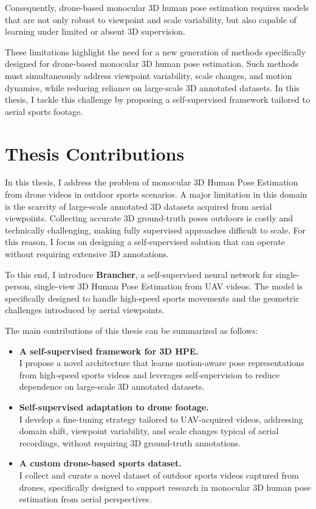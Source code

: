 Consequently, drone-based monocular 3D human pose estimation requires models that are not only robust to viewpoint and scale variability, but also capable of learning under limited or absent 3D supervision.

These limitations highlight the need for a new generation of methods specifically designed for drone-based monocular 3D human pose estimation. Such methods must simultaneously address viewpoint variability, scale changes, and motion dynamics, 
while reducing reliance on large-scale 3D annotated datasets.
In this thesis, I tackle this challenge by proposing a self-supervised framework tailored to aerial sports footage.

\section{Thesis Contributions}
In this thesis, I address the problem of monocular 3D Human Pose Estimation from drone videos in outdoor sports scenarios. A major limitation in this domain is the scarcity of large-scale annotated 3D datasets acquired from aerial 
viewpoints. Collecting accurate 3D ground-truth poses outdoors is costly and technically challenging, making fully supervised approaches difficult to scale. For this reason, I focus on designing a self-supervised solution that can 
operate without requiring extensive 3D annotations.

To this end, I introduce \textbf{Brancher}, a self-supervised neural network for single-person, single-view 3D Human Pose Estimation from UAV videos. The model is specifically designed to handle high-speed sports movements and the 
geometric challenges introduced by aerial viewpoints.

The main contributions of this thesis can be summarized as follows:
\begin{itemize}
    \item \textbf{A self-supervised framework for 3D HPE.}\\
    I propose a novel architecture that learns motion-aware pose representations from high-speed sports videos and leverages self-supervision to reduce dependence on large-scale 3D annotated datasets.
    \\\item \textbf{Self-supervised adaptation to drone footage.}\\
    I develop a fine-tuning strategy tailored to UAV-acquired videos, addressing domain shift, viewpoint variability, and scale changes typical of aerial recordings, without requiring 3D ground-truth annotations.
    \item \textbf{A custom drone-based sports dataset.}\\
    I collect and curate a novel dataset of outdoor sports videos captured from drones, specifically designed to support research in monocular 3D human pose estimation from aerial perspectives.
\end{itemize}

